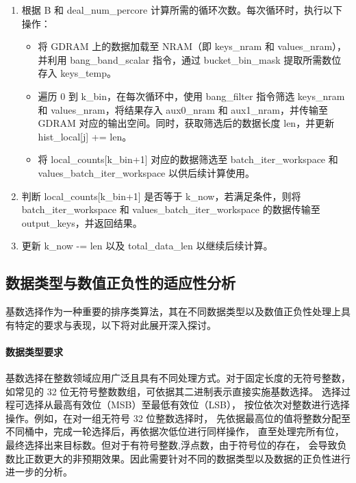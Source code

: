 \begin{enumerate}
    \item 根据 B 和 deal\_num\_percore 计算所需的循环次数。每次循环时，执行以下操作：
    \begin{itemize}
        \item 将 GDRAM 上的数据加载至 NRAM（即 keys\_nram 和 values\_nram），并利用 bang\_band\_scalar 指令，通过 bucket\_bin\_mask 提取所需数位存入 keys\_temp。
        \item 遍历 0 到 k\_bin，在每次循环中，使用 bang\_filter 指令筛选 keys\_nram 和 values\_nram，将结果存入 aux0\_nram 和 aux1\_nram，并传输至 GDRAM 对应的输出空间。同时，获取筛选后的数据长度 len，并更新 hist\_local[j] += len。
        \item 将 local\_counts[k\_bin+1] 对应的数据筛选至 batch\_iter\_workspace 和 values\_batch\_iter\_workspace 以供后续计算使用。
    \end{itemize}
    
    \item 判断 local\_counts[k\_bin+1] 是否等于 k\_now，若满足条件，则将 batch\_iter\_workspace 和 values\_batch\_iter\_workspace 的数据传输至 output\_keys，并返回结果。

    \item 更新 k\_now -= len 以及 total\_data\_len 以继续后续计算。
\end{enumerate}







\subsection{数据类型与数值正负性的适应性分析}


基数选择作为一种重要的排序类算法，其在不同数据类型以及数值正负性处理上具有特定的要求与表现，以下将对此展开深入探讨。

\paragraph{数据类型要求}

基数选择在整数领域应用广泛且具有不同处理方式。对于固定长度的无符号整数，
如常见的 32 位无符号整数数组，可依据其二进制表示直接实施基数选择。
选择过程可选择从最高有效位（MSB）至最低有效位（LSB），
按位依次对整数进行选择操作。例如，在对一组无符号 32 位整数选择时，
先依据最高位的值将整数分配至不同桶中，完成一轮选择后，再依据次低位进行同样操作，
直至处理完所有位，最终选择出来目标数。但对于有符号整数,浮点数，由于符号位的存在，
会导致负数比正数更大的非预期效果。因此需要针对不同的数据类型以及数据的正负性进行
进一步的分析。

